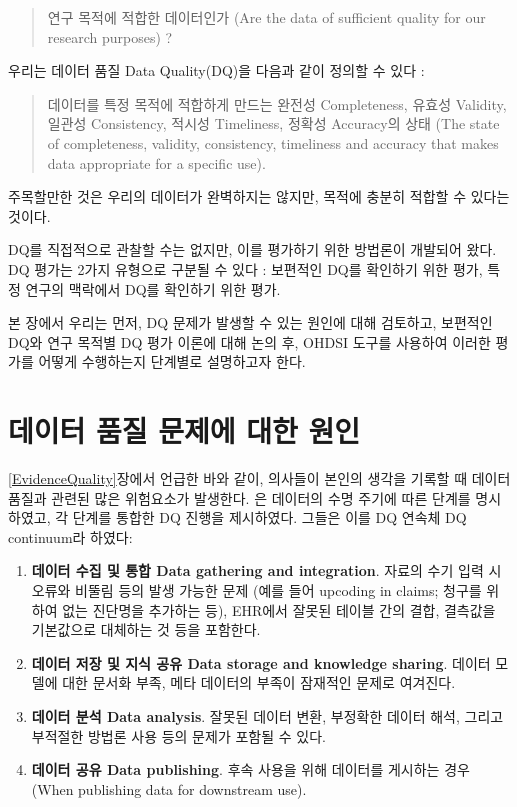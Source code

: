 \documentclass[10.5pt]{book}
\providecommand{\tightlist}{%
  \setlength{\itemsep}{0pt}\setlength{\parskip}{0pt}}
\theoremstyle{definition}
\theoremstyle{definition}
\theoremstyle{definition}
\theoremstyle{remark}
\begin{document}
\begin{quote}
연구 목적에 적합한 데이터인가 (Are the data of sufficient quality for
our research purposes) ?
\end{quote}

우리는 데이터 품질 Data Quality(DQ)을 다음과 같이 정의할 수 있다
\citep{roebuck_2012}: 

\begin{quote}
데이터를 특정 목적에 적합하게 만드는 완전성 Completeness, 유효성
Validity, 일관성 Consistency, 적시성 Timeliness, 정확성 Accuracy의 상태
(The state of completeness, validity, consistency, timeliness and
accuracy that makes data appropriate for a specific use).
\end{quote}

주목할만한 것은 우리의 데이터가 완벽하지는 않지만, 목적에 충분히 적합할
수 있다는 것이다.

DQ를 직접적으로 관찰할 수는 없지만, 이를 평가하기 위한 방법론이 개발되어
왔다. DQ 평가는 2가지 유형으로 구분될 수 있다 \citep{weiskopf_2013}:
보편적인 DQ를 확인하기 위한 평가, 특정 연구의 맥락에서 DQ를 확인하기
위한 평가.

본 장에서 우리는 먼저, DQ 문제가 발생할 수 있는 원인에 대해 검토하고,
보편적인 DQ와 연구 목적별 DQ 평가 이론에 대해 논의 후, OHDSI 도구를
사용하여 이러한 평가를 어떻게 수행하는지 단계별로 설명하고자 한다.

\section{데이터 품질 문제에 대한 원인}\label{----}

\ref{EvidenceQuality}장에서 언급한 바와 같이, 의사들이 본인의 생각을
기록할 때 데이터 품질과 관련된 많은 위험요소가 발생한다.
\citet{dasu_2003} 은 데이터의 수명 주기에 따른 단계를 명시하였고, 각
단계를 통합한 DQ 진행을 제시하였다. 그들은 이를 DQ 연속체 DQ continuum라
하였다:

\begin{enumerate}
\def\labelenumi{\arabic{enumi}.}
\tightlist
\item
  \textbf{데이터 수집 및 통합 Data gathering and integration}. 자료의
  수기 입력 시 오류와 비뚤림 등의 발생 가능한 문제 (예를 들어 upcoding
  in claims; 청구를 위하여 없는 진단명을 추가하는 등), EHR에서 잘못된
  테이블 간의 결합, 결측값을 기본값으로 대체하는 것 등을 포함한다.
\item
  \textbf{데이터 저장 및 지식 공유 Data storage and knowledge sharing}.
  데이터 모델에 대한 문서화 부족, 메타 데이터의 부족이 잠재적인 문제로
  여겨진다.
\item
  \textbf{데이터 분석 Data analysis}. 잘못된 데이터 변환, 부정확한
  데이터 해석, 그리고 부적절한 방법론 사용 등의 문제가 포함될 수 있다.
\item
  \textbf{데이터 공유 Data publishing}. 후속 사용을 위해 데이터를
  게시하는 경우 (When publishing data for downstream use).
\end{enumerate}
\end{document}
